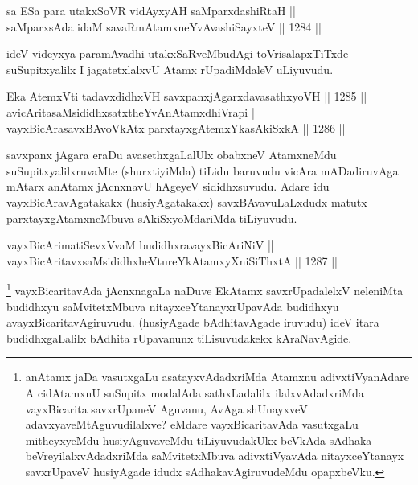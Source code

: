 \begin{shl}
sa ESa para utakxSoVR vidAyxyAH saMparxdashiRtaH ||  \\
saMparxsAda idaM savaRmAtamxneYvAvashiSayxteV \hfill || 1284 ||  
\end{shl}

\begin{artha}
ideV videyxya paramAvadhi utakxSaRveMbudAgi toVrisalapxTiTxde suSupitxyalilx I jagatetxlalxvU Atamx rUpadiMdaleV uLiyuvudu.
\end{artha}


\begin{shl}
Eka AtemxVti tadavxdidhxVH savxpanxjAgarxdavasathxyoVH \hfill || 1285 ||  \\
avicAritasaMsididhxsatxtheYvAnAtamxdhiVrapi || \\
vayxBicArasavxBAvoVkAtx parxtayxgAtemxYkasAkiSxkA \hfill || 1286 ||  
\end{shl}

\begin{artha}
savxpanx jAgara eraDu avasethxgaLalUlx obabxneV AtamxneMdu suSupitxyalilxruvaMte (shurxtiyiMda) tiLidu baruvudu vicAra mADadiruvAga mAtarx anAtamx jAcnxnavU hAgeyeV sididhxsuvudu. Adare idu vayxBicAravAgatakakx (husiyAgatakakx) savxBAvavuLaLxdudx matutx parxtayxgAtamxneMbuva sAkiSxyoMdariMda tiLiyuvudu.
\end{artha}

\begin{shl}
vayxBicArimatiSevxVvaM budidhxravayxBicAriNiV || \\
vayxBicAritavxsaMsididhxheVtureYkAtamxyXniSiThxtA \hfill || 1287 ||  
\end{shl}

\begin{artha}
\footnote{anAtamx jaDa vasutxgaLu asatayxvAdadxriMda Atamxnu adivxtiVyanAdare A cidAtamxnU suSupitx modalAda sathxLadalilx ilalxvAdadxriMda vayxBicarita savxrUpaneV Aguvanu, AvAga shUnayxveV adavxyaveMtAguvudilalxve? eMdare vayxBicaritavAda vasutxgaLu mitheyxyeMdu husiyAguvaveMdu tiLiyuvudakUkx beVkAda sAdhaka beVreyilalxvAdadxriMda saMvitetxMbuva adivxtiVyavAda nitayxceYtanayx savxrUpaveV husiyAgade idudx sAdhakavAgiruvudeMdu opapxbeVku.}
vayxBicaritavAda jAcnxnagaLa naDuve EkAtamx savxrUpadalelxV neleniMta budidhxyu saMvitetxMbuva nitayxceYtanayxrUpavAda budidhxyu avayxBicaritavAgiruvudu. (husiyAgade bAdhitavAgade iruvudu) ideV itara budidhxgaLalilx bAdhita rUpavanunx tiLisuvudakekx kAraNavAgide.
\end{artha}

